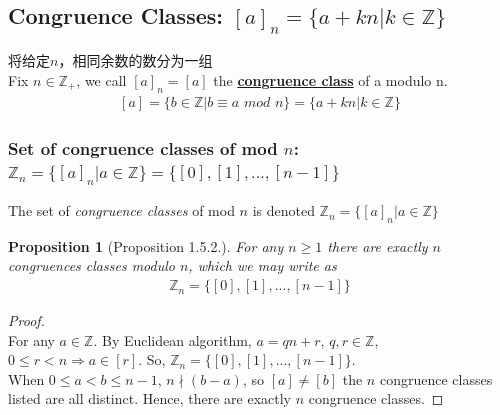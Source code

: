 \documentclass[11pt,a4paper]{article}
\newtheorem{proposition}{Proposition}
\begin{document}
\subsection{Congruence Classes: $[a]_n=\{a+kn|k\in\mathbb{Z} \}$}
将给定$n$，相同余数的数分为一组\\
Fix $n\in\mathbb{Z}_+$, we call $[a]_{n}=[a]$ the \underline{\textbf{congruence class}} of a modulo n.
\begin{equation}
    \begin{aligned}
        [a] = \{b \in \mathbb{Z}|b\equiv a \textit{ mod }n\}=\{a+kn|k\in\mathbb{Z} \}
    \end{aligned}
    \nonumber
\end{equation}

\subsubsection{Set of congruence classes of mod $n$: $\mathbb{Z}_n = \{[a]_n|a \in \mathbb{Z}\}=\{[0],[1],...,[n-1]\}$}
The set of \textit{congruence classes} of mod $n$ is denoted $\mathbb{Z}_n = \{[a]_n|a \in \mathbb{Z}\}$
\begin{proposition}[Proposition 1.5.2.]
For any $n\geq 1$ there are exactly $n$ congruences classes modulo $n$, which we may write as
\begin{equation}
    \begin{aligned}
        \mathbb{Z}_n = \{[0],[1],...,[n-1]\}
    \end{aligned}
    \nonumber
\end{equation}
\end{proposition}
\begin{proof}
\quad\\
For any $a\in\mathbb{Z}$. By Euclidean algorithm, $a=qn+r$, $q,r\in\mathbb{Z}$, $0\leq r<n\Rightarrow a\in[r]$. So, $\mathbb{Z}_n = \{[0],[1],...,[n-1]\}$.\\
When $0\leq a<b\leq n-1$, $n\nmid(b-a)$, so $[a]\neq [b]$ the $n$ congruence classes listed are all distinct. Hence, there are exactly $n$ congruence classes.
\end{proof}
\end{document}
